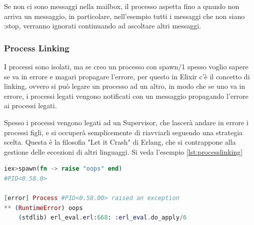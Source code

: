 Se non ci sono messaggi nella mailbox, il processo aspetta fino a
quando non arriva un messaggio, in particolare, 
nell'esempio tutti i messaggi che
non siano :stop, verranno ignorati continuando ad ascoltare altri
messaggi.

\subsubsection{Process Linking}

I processi sono isolati, ma se creo un processo con spawn/1
spesso voglio sapere se va in errore e magari
propagare l'errore, per questo
in Elixir c'è il concetto di linking, ovvero si può legare un
processo ad un altro, in modo che se uno va in errore,
i processi legati vengono notificati con un messaggio propagando l'errore
ai processi legati.

Spesso i processi vengono legati ad un Supervisor, che
lascerà andare in errore i processi figli, e si occuperà
semplicemente di riavviarli seguendo una strategia scelta.
Questa è la filosofia "Let it Crash"
di Erlang, che si contrappone alla gestione delle eccezioni
di altri linguaggi. Si veda l'esempio \ref{lst:processlinking}

\begin{lstlisting}[language=elixir, caption={Process linking},captionpos=b
	label={lst:processlinking}]
iex>spawn(fn -> raise "oops" end)
#PID<0.58.0>
	
[error] Process #PID<0.58.00> raised an exception
** (RuntimeError) oops
	(stdlib) erl_eval.erl:668: :erl_eval.do_apply/6
\end{lstlisting}





